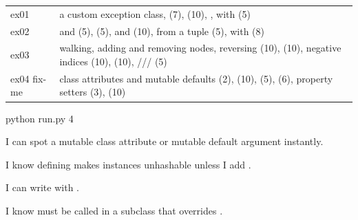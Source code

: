 \documentclass[10pt,a4paper]{article}
\begin{document}
\begin{datatable}{}{\footnotesize}
\begin{xltabular}{\linewidth}{@{}Y{0.40}Y{1.60}@{}}
 &  \\ \hline
\endhead
ex01  & a custom exception class,  (7),  (10), ,  with  (5) \\
ex02  &  and  (5),  (5), \code{**} and  (10),  from a tuple (5),  with  (8) \\
ex03  & walking, adding and removing nodes, reversing (10),  (10), negative indices (10),  (10), /// (5) \\
ex04 fix-me & class attributes and mutable defaults (2),  (10),  (5),  (6), property setters (3),  (10) \\
\hline
\end{xltabular}
\end{datatable}
\begin{shcode}
python run.py 4
\end{shcode}
\begin{checklistbox}
\begin{checklist}
\item I can spot a mutable class attribute or mutable default argument instantly.
\item I know defining  makes instances unhashable unless I add .
\item I can write  with .
\item I know  must be called in a subclass that overrides .
\end{checklist}
\scoreline
\end{checklistbox}
\end{document}
